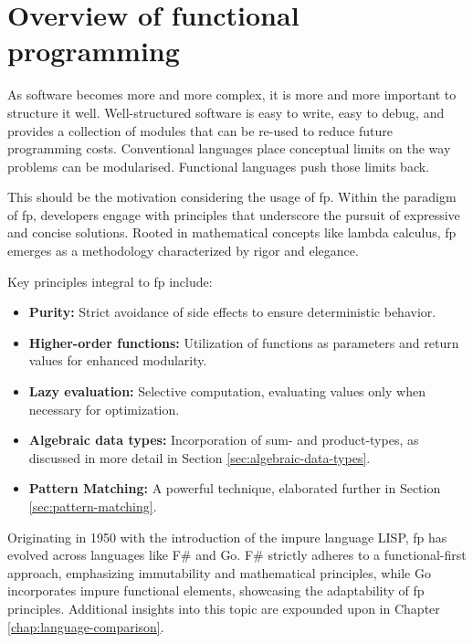     \chapter{Overview of functional programming}\label{chap:functional-programming}
    \begin{shaded}
        \noindent
        \glqq{}As software becomes more and more complex, it is more and more important to structure it well. Well-structured software is easy to write, easy to debug, and provides a collection of modules that can be re-used to reduce future programming costs. Conventional languages place conceptual limits on the way problems can be modularised. Functional languages push those limits back.\grqq{} \cite{Hughes1989}
    \end{shaded}
    This should be the motivation considering the usage of \ac{fp}.
    Within the paradigm of \ac{fp}, developers engage with principles that underscore the pursuit of expressive and concise solutions. Rooted in mathematical concepts like lambda calculus, \ac{fp} emerges as a methodology characterized by rigor and elegance.
    
    Key principles integral to \ac{fp} include:
    
    \begin{itemize}
        \item \textbf{Purity:} Strict avoidance of side effects to ensure deterministic behavior.
        \item \textbf{Higher-order functions:} Utilization of functions as parameters and return values for enhanced modularity.
        \item \textbf{Lazy evaluation:} Selective computation, evaluating values only when necessary for optimization.
        \item \textbf{Algebraic data types:} Incorporation of sum- and product-types, as discussed in more detail in Section \ref{sec:algebraic-data-types}.
        \item \textbf{Pattern Matching:} A powerful technique, elaborated further in Section \ref{sec:pattern-matching}.
    \end{itemize}
    
    Originating in 1950 with the introduction of the impure language LISP, \ac{fp} has evolved across languages like F\# and Go. F\# strictly adheres to a functional-first approach, emphasizing immutability and mathematical principles, while Go incorporates impure functional elements, showcasing the adaptability of \ac{fp} principles. Additional insights into this topic are expounded upon in Chapter \ref{chap:language-comparison}.
    
